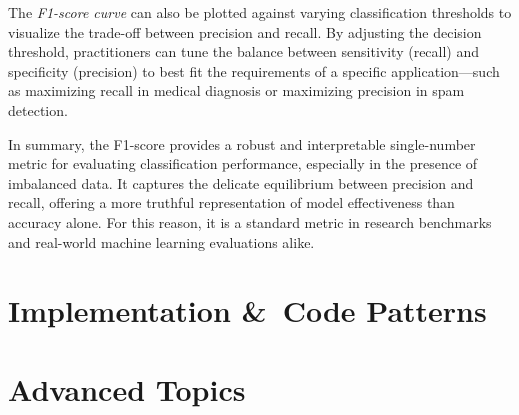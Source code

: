 \documentclass[12pt,a4paper]{report}
\begin{document}
\vspace{0.5em}
The \textit{F1-score curve} can also be plotted against varying classification thresholds to visualize the trade-off between precision and recall. 
By adjusting the decision threshold, practitioners can tune the balance between sensitivity (recall) and specificity (precision) to best fit the requirements of a specific application—such as maximizing recall in medical diagnosis or maximizing precision in spam detection.

\vspace{0.5em}
In summary, the F1-score provides a robust and interpretable single-number metric for evaluating classification performance, especially in the presence of imbalanced data. 
It captures the delicate equilibrium between precision and recall, offering a more truthful representation of model effectiveness than accuracy alone. 
For this reason, it is a standard metric in research benchmarks and real-world machine learning evaluations alike.


\chapter{Implementation \&\ Code Patterns}

\chapter{Advanced Topics}
\end{document}
